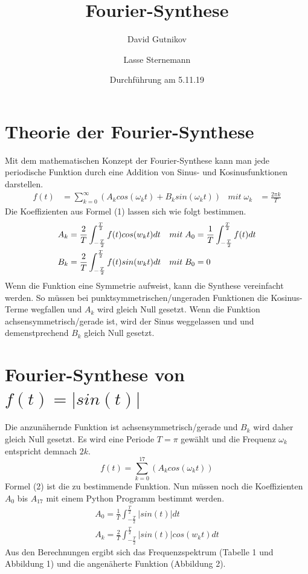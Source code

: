 \documentclass[titlepage = firstcover]{scrartcl}
\title{Fourier-Synthese}
\author{David Gutnikov \and Lasse Sternemann}
\date{Durchführung am 5.11.19}
\begin{document}
    \maketitle
    \tableofcontents
    \newpage

    \section{Theorie der Fourier-Synthese}
    Mit dem mathematischen Konzept der Fourier-Synthese kann man jede periodische Funktion durch eine Addition
    von Sinus- und Kosinusfunktionen darstellen. 
    \begin{align}
        f(t) &= \sum_{k=0}^\infty (A_k cos(\omega_k t)+B_k sin(\omega_k t))  & mit\; \omega_k &= \frac{2 \pi k}{T} 
    \end{align}
    Die Koeffizienten aus Formel (1) lassen sich wie folgt bestimmen.
    \begin{align*}
        A_k &= \frac{2}{T} \int_{-\frac{T}{2}}^{\frac{T}{2}} f(t) cos(w_k t)dt  & mit\; A_0 &= \frac{1}{T} \int_{-\frac{T}{2}}^{\frac{T}{2}} f(t)dt   \vspace{80pt}        \\ 
        B_k &= \frac{2}{T} \int_{-\frac{T}{2}}^{\frac{T}{2}} f(t) sin(w_k t)dt   & mit\; B_0 &= 0 
    \end{align*}
    Wenn die Funktion eine Symmetrie aufweist, kann die Synthese vereinfacht werden. So müssen bei punktsymmetrischen/ungeraden Funktionen
    die Kosinus-Terme wegfallen und $A_k$ wird gleich Null gesetzt. Wenn die Funktion achsensymmetrisch/gerade ist, wird  der Sinus weggelassen und
    und demenstprechend $B_k$ gleich Null gesetzt.

    \section{Fourier-Synthese von $f(t)=|sin(t)|$}
    Die anzunähernde Funktion ist achsensymmetrisch/gerade und $B_k$ wird daher gleich Null gesetzt. Es wird eine Periode $T=\pi$ gewählt 
    und die Frequenz $\omega_k$ entspricht demnach $2k$. 
    \begin{equation}
        f(t) = \sum_{k=0}^{17} (A_k cos(\omega_k t))
    \end{equation} 
    Formel (2) ist die zu bestimmende Funktion. Nun müssen noch die Koeffizienten $A_0$ bis $A_{17}$ mit einem Python Programm bestimmt werden.
    \begin{gather*}
        A_0 = \frac{1}{T} \int_{-\frac{T}{2}}^{\frac{T}{2}} |sin(t)|dt \\
        A_k = \frac{2}{T} \int_{-\frac{T}{2}}^{\frac{T}{2}} |sin(t)| cos(w_k t)dt 
    \end{gather*}
    \newpage
    Aus den Berechnungen ergibt sich das Frequenzspektrum (Tabelle 1 und Abbildung 1) und die angenäherte Funktion (Abbildung 2).
\end{document}
